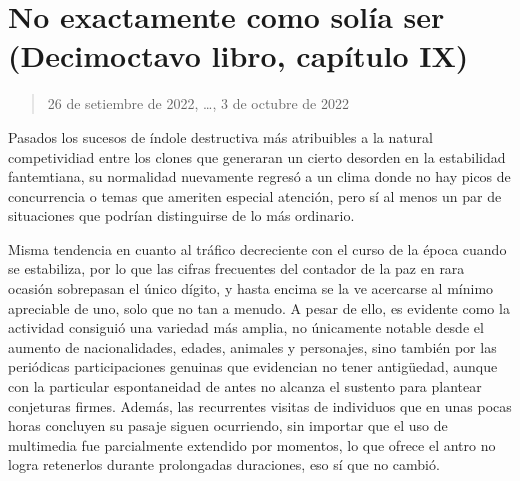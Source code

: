 \documentclass[
]{book}
\begin{document}
\hypertarget{no-exactamente-como-soluxeda-ser-decimoctavo-libro-capuxedtulo-ix}{%
\section{No exactamente como solía ser (Decimoctavo libro, capítulo IX)}\label{no-exactamente-como-soluxeda-ser-decimoctavo-libro-capuxedtulo-ix}}

\begin{quote}
26 de setiembre de 2022, \ldots, 3 de octubre de 2022
\end{quote}

Pasados los sucesos de índole destructiva más atribuibles a la natural competividiad entre los clones que generaran un cierto desorden en la estabilidad fantemtiana, su normalidad nuevamente regresó a un clima donde no hay picos de concurrencia o temas que ameriten especial atención, pero sí al menos un par de situaciones que podrían distinguirse de lo más ordinario.

Misma tendencia en cuanto al tráfico decreciente con el curso de la época cuando se estabiliza, por lo que las cifras frecuentes del contador de la paz en rara ocasión sobrepasan el único dígito, y hasta encima se la ve acercarse al mínimo apreciable de uno, solo que no tan a menudo. A pesar de ello, es evidente como la actividad consiguió una variedad más amplia, no únicamente notable desde el aumento de nacionalidades, edades, animales y personajes, sino también por las periódicas participaciones genuinas que evidencian no tener antigüedad, aunque con la particular espontaneidad de antes no alcanza el sustento para plantear conjeturas firmes. Además, las recurrentes visitas de individuos que en unas pocas horas concluyen su pasaje siguen ocurriendo, sin importar que el uso de multimedia fue parcialmente extendido por momentos, lo que ofrece el antro no logra retenerlos durante prolongadas duraciones, eso sí que no cambió.
\end{document}
